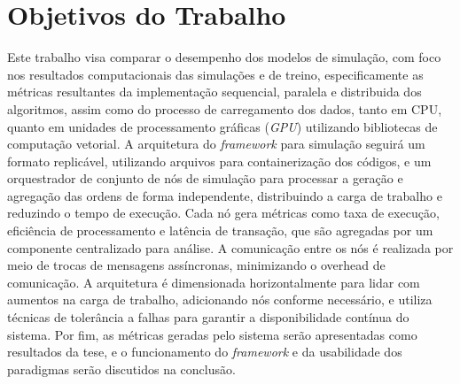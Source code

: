 \chapter{Objetivos do Trabalho}
Este trabalho visa comparar o desempenho dos modelos de simulação, com foco nos resultados computacionais das simulações e de treino, especificamente as métricas resultantes da implementação sequencial, paralela e distribuida dos algoritmos, assim como do processo de carregamento dos dados, tanto em CPU, quanto em unidades de processamento gráficas (\textit{GPU}) utilizando bibliotecas de computação vetorial. A arquitetura do \textit{framework} para simulação seguirá um formato replicável, utilizando arquivos para containerização dos códigos, e um orquestrador de conjunto de nós de simulação para processar a geração e agregação das ordens de forma independente, distribuindo a carga de trabalho e reduzindo o tempo de execução. Cada nó gera métricas como taxa de execução, eficiência de processamento e latência de transação, que são agregadas por um componente centralizado para análise. A comunicação entre os nós é realizada por meio de trocas de mensagens assíncronas, minimizando o overhead de comunicação. A arquitetura é dimensionada horizontalmente para lidar com aumentos na carga de trabalho, adicionando nós conforme necessário, e utiliza técnicas de tolerância a falhas para garantir a disponibilidade contínua do sistema. Por fim, as métricas geradas pelo sistema serão apresentadas como resultados da tese, e o funcionamento do \textit{framework} e da usabilidade dos paradigmas serão discutidos na conclusão.
